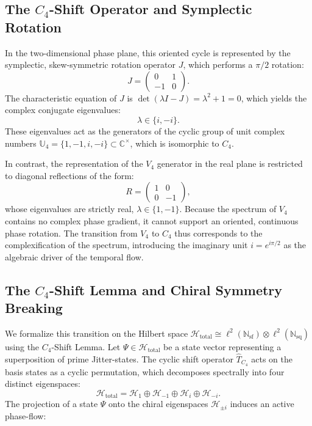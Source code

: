 \documentclass[11pt,a4paper]{article}
\theoremstyle{definition}
\begin{document}
	\subsection{The $C_4$-Shift Operator and Symplectic Rotation}
	In the two-dimensional phase plane, this oriented cycle is represented by the symplectic, skew-symmetric rotation operator $J$, which performs a $\pi/2$ rotation:
	\begin{equation}
		J = \begin{pmatrix} 0 & 1 \\ -1 & 0 \end{pmatrix}.
	\end{equation}
	The characteristic equation of $J$ is $\det(\lambda I - J) = \lambda^2 + 1 = 0$, which yields the complex conjugate eigenvalues:
	\begin{equation}
		\lambda \in \{i, -i\}.
	\end{equation}
	These eigenvalues act as the generators of the cyclic group of unit complex numbers $\mathbb{U}_4 = \{1, -1, i, -i\} \subset \mathbb{C}^\times$, which is isomorphic to $C_4$. 
	
	In contrast, the representation of the $V_4$ generator in the real plane is restricted to diagonal reflections of the form:
	\begin{equation}
		R = \begin{pmatrix} 1 & 0 \\ 0 & -1 \end{pmatrix},
	\end{equation}
	whose eigenvalues are strictly real, $\lambda \in \{1, -1\}$. Because the spectrum of $V_4$ contains no complex phase gradient, it cannot support an oriented, continuous phase rotation. The transition from $V_4$ to $C_4$ thus corresponds to the complexification of the spectrum, introducing the imaginary unit $i = e^{i\pi/2}$ as the algebraic driver of the temporal flow.
	
	\subsection{The $C_4$-Shift Lemma and Chiral Symmetry Breaking}
	We formalize this transition on the Hilbert space $\mathcal{H}_{\text{total}} \cong \ell^2(\mathbb{N}_{\text{sf}}) \otimes \ell^2(\mathbb{N}_{\text{sq}})$ using the $C_4$-Shift Lemma. Let $\Psi \in \mathcal{H}_{\text{total}}$ be a state vector representing a superposition of prime Jitter-states. The cyclic shift operator $\hat{T}_{C_4}$ acts on the basis states as a cyclic permutation, which decomposes spectrally into four distinct eigenspaces:
	\begin{equation}
		\mathcal{H}_{\text{total}} = \mathcal{H}_1 \oplus \mathcal{H}_{-1} \oplus \mathcal{H}_i \oplus \mathcal{H}_{-i}.
	\end{equation}
	The projection of a state $\Psi$ onto the chiral eigenspaces $\mathcal{H}_{\pm i}$ induces an active phase-flow:
	
\end{document}
